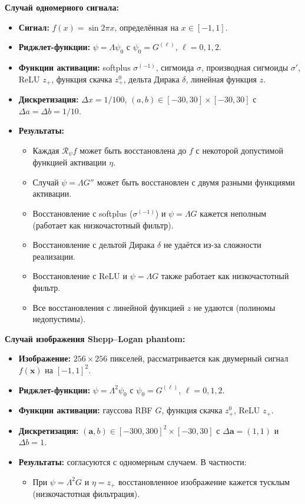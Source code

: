 \documentclass[12pt]{article}
\begin{document}
\textbf{Случай одномерного сигнала:}
\begin{itemize}
	\item \textbf{Сигнал:} \( f(x) = \sin 2\pi x \), определённая на \( x \in [-1, 1] \).
	\item \textbf{Риджлет-функции:} \( \psi = \Lambda \psi_0 \) с \( \psi_0 = G^{(\ell)} \), \( \ell = 0, 1, 2 \).
	\item \textbf{Функции активации:} softplus \( \sigma^{(-1)} \), сигмоида \( \sigma \), производная сигмоиды \( \sigma' \), ReLU \( z_+ \), функция скачка \( z_+^0 \), дельта Дирака \( \delta \), линейная функция \( z \).
	\item \textbf{Дискретизация:} \( \Delta x = 1/100 \), \( (a, b) \in [-30, 30] \times [-30, 30] \) с \( \Delta a = \Delta b = 1/10 \).
	\item \textbf{Результаты:}
	\begin{itemize}
		\item Каждая \( \mathscr{R}_\psi f \) может быть восстановлена до \( f \) с некоторой допустимой функцией активации \( \eta \).
		\item Случай \( \psi = \Lambda G'' \) может быть восстановлен с двумя разными функциями активации.
		\item Восстановление с softplus (\( \sigma^{(-1)} \)) и \( \psi = \Lambda G \) кажется неполным (работает как низкочастотный фильтр).
		\item Восстановление с дельтой Дирака \( \delta \) не удаётся из-за сложности реализации.
		\item Восстановление с ReLU и \( \psi = \Lambda G \) также работает как низкочастотный фильтр.
		\item Все восстановления с линейной функцией \( z \) не удаются (полиномы недопустимы).
	\end{itemize}
\end{itemize}

\textbf{Случай изображения Shepp–Logan phantom:}
\begin{itemize}
	\item \textbf{Изображение:} \( 256 \times 256 \) пикселей, рассматривается как двумерный сигнал \( f(\mathbf{x}) \) на \( [-1, 1]^2 \).
	\item \textbf{Риджлет-функции:} \( \psi = \Lambda^2 \psi_0 \) с \( \psi_0 = G^{(\ell)} \), \( \ell = 0, 1, 2 \).
	\item \textbf{Функции активации:} гауссова RBF \( G \), функция скачка \( z_+^0 \), ReLU \( z_+ \).
	\item \textbf{Дискретизация:} \( (\mathbf{a}, b) \in [-300, 300]^2 \times [-30, 30] \) с \( \Delta \mathbf{a} = (1, 1) \) и \( \Delta b = 1 \).
	\item \textbf{Результаты:} согласуются с одномерным случаем. В частности:
	\begin{itemize}
		\item При \( \psi = \Lambda^2 G \) и \( \eta = z_+ \) восстановленное изображение кажется тусклым (низкочастотная фильтрация).
	\end{itemize}
\end{itemize}
\end{document}
